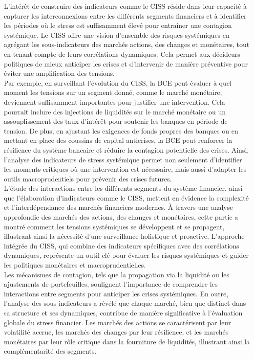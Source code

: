 \begin{sloppypar}
L'intérêt de construire des indicateurs comme le CISS réside dans leur capacité à capturer les interconnexions entre les différents segments financiers et à identifier les périodes où le stress est suffisamment élevé pour entraîner une contagion systémique. Le CISS offre une vision d’ensemble des risques systémiques en agrégant les sous-indicateurs des marchés actions, des changes et monétaires, tout en tenant compte de leurs corrélations dynamiques. Cela permet aux décideurs politiques de mieux anticiper les crises et d'intervenir de manière préventive pour éviter une amplification des tensions.\\

Par exemple, en surveillant l'évolution du CISS, la BCE peut évaluer à quel moment les tensions sur un segment donné, comme le marché monétaire, deviennent suffisamment importantes pour justifier une intervention. Cela pourrait inclure des injections de liquidités sur le marché monétaire ou un assouplissement des taux d'intérêt pour soutenir les banques en période de tension. De plus, en ajustant les exigences de fonds propres des banques ou en mettant en place des coussins de capital anticrises, la BCE peut renforcer la résilience du système bancaire et réduire la contagion potentielle des crises. Ainsi, l’analyse des indicateurs de stress systémique permet non seulement d'identifier les moments critiques où une intervention est nécessaire, mais aussi d'adapter les outils macroprudentiels pour prévenir des crises futures.\\

L’étude des interactions entre les différents segments du système financier, ainsi que l’élaboration d’indicateurs comme le CISS, mettent en évidence la complexité et l’interdépendance des marchés financiers modernes. À travers une analyse approfondie des marchés des actions, des changes et monétaires, cette partie a montré comment les tensions systémiques se développent et se propagent, illustrant ainsi la nécessité d’une surveillance holistique et proactive. L’approche intégrée du CISS, qui combine des indicateurs spécifiques avec des corrélations dynamiques, représente un outil clé pour évaluer les risques systémiques et guider les politiques monétaires et macroprudentielles.\\

Les mécanismes de contagion, tels que la propagation via la liquidité ou les ajustements de portefeuilles, soulignent l’importance de comprendre les interactions entre segments pour anticiper les crises systémiques. En outre, l’analyse des sous-indicateurs a révélé que chaque marché, bien que distinct dans sa structure et ses dynamiques, contribue de manière significative à l’évaluation globale du stress financier. Les marchés des actions se caractérisent par leur volatilité accrue, les marchés des changes par leur résilience, et les marchés monétaires par leur rôle critique dans la fourniture de liquidités, illustrant ainsi la complémentarité des segments.\\


\end{sloppypar}

